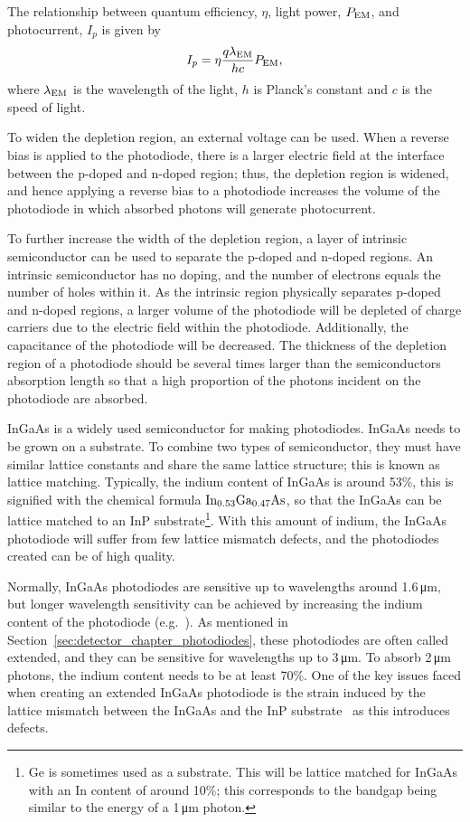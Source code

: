 \par 
The relationship between quantum efficiency, $\eta$, light power, $P_{\rm{EM}}$, and photocurrent, $I_p$ is given by 
\begin{equation}
I_p = \eta\frac{q\lambda_{\rm{EM}}}{hc}P_{\rm{EM}},
\end{equation}
where $\lambda_{\rm{EM}}$ is the wavelength of the light, $h$ is Planck's constant and $c$ is the speed of light.
\par
To widen the depletion region, an external voltage can be used. When a reverse bias is applied to the photodiode, there is a larger electric field at the interface between the p-doped and n-doped region; thus, the depletion region is widened, and hence applying a reverse bias to a photodiode increases the volume of the photodiode in which absorbed photons will generate photocurrent.
\par
To further increase the width of the depletion region, a layer of intrinsic semiconductor can be used to separate the p-doped and n-doped regions. An intrinsic semiconductor has no doping, and the number of electrons equals the number of holes within it. As the intrinsic region physically separates p-doped and n-doped regions, a larger volume of the photodiode will be depleted of charge carriers due to the electric field within the photodiode. Additionally, the capacitance of the photodiode will be decreased. The thickness of the depletion region of a photodiode should be several times larger than the semiconductors absorption length so that a high proportion of the photons incident on the photodiode are absorbed. 
\par
InGaAs is a widely used semiconductor for making photodiodes. InGaAs needs to be grown on a substrate. To combine two types of semiconductor, they must have similar lattice constants and share the same lattice structure; this is known as lattice matching. Typically, the indium content of InGaAs is around 53\%, this is signified with the chemical formula $\rm{In_{0.53}Ga_{0.47}As}$, so that the InGaAs can be lattice matched to an InP substrate\footnote{Ge is sometimes used as a substrate. This will be lattice matched for InGaAs with an In content of around 10\%; this corresponds to the bandgap being similar to the energy of a 1\,\si{\micro\metre} photon.}. With this amount of indium, the InGaAs photodiode will suffer from few lattice mismatch defects, and the photodiodes created can be of high quality. 
\par
Normally, InGaAs photodiodes are sensitive up to wavelengths around 1.6\,\si{\micro\metre}, but longer wavelength sensitivity can be achieved by increasing the indium content of the photodiode (e.g.~\cite{Martinelli1988,Alam2007,Chen2018}). As mentioned in Section~\ref{sec:detector_chapter_photodiodes}, these photodiodes are often called extended, and they can be sensitive for wavelengths up to 3\,\si{\micro\metre}. To absorb 2\,\si{\micro\metre} photons, the indium content needs to be at least 70\%. One of the key issues faced when creating an extended InGaAs photodiode is the strain induced by the lattice mismatch between the InGaAs and the InP substrate~\cite{Gendry1992} as this introduces defects.
